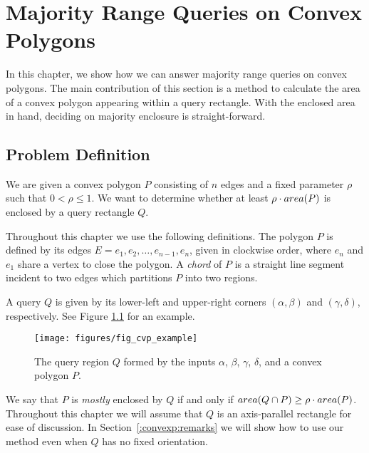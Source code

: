 \chapter{Majority Range Queries on Convex Polygons}
\label{:convexp}

In this chapter, we show how we can answer majority range queries on convex polygons. The main contribution of this section is a method to calculate the area of a convex polygon appearing within a query rectangle. With the enclosed area in hand, deciding on majority enclosure is straight-forward.


\section{Problem Definition}
\label{:convexp:problem-definition}

\begin{problem}
We are given a convex polygon $P$ consisting of $n$ edges and a fixed parameter $\rho$ such that $0 < \rho \leq 1$. We want to determine whether at least $\rho \cdot area(P)$ is enclosed by a query rectangle $Q$.
\end{problem}

Throughout this chapter we use the following definitions. The polygon $P$ is defined by its edges $E = e_1, e_2, \ldots, e_{n-1}, e_n$, given in clockwise order, where $e_n$ and $e_1$ share a vertex to close the polygon.  A \emph{chord} of $P$ is a straight line segment incident to two edges which partitions $P$ into two regions.

A query $Q$ is given by its lower-left and upper-right corners $(\alpha, \beta)$ and $(\gamma, \delta)$, respectively. See Figure \ref{fig:convexp:example} for an example.

\begin{figure}[t]
\begin{center}
  \texttt{[image: figures/fig\_cvp\_example]}
  \caption[A convex polygon $P$ and query box $Q$.]{The query region $Q$ formed by the inputs $\alpha$, $\beta$, $\gamma$,  $\delta$, and a convex polygon $P$.}
  \label{fig:convexp:example}
\end{center}
\end{figure}

We say that $P$ is \emph{mostly} enclosed by $Q$ if and only if $area(Q \cap P) \geq \rho \cdot area(P)$. Throughout this chapter we will assume that $Q$ is an axis-parallel rectangle for ease of discussion. In Section~\ref{:convexp:remarks} we will show how to use our method even when $Q$ has no fixed orientation.

